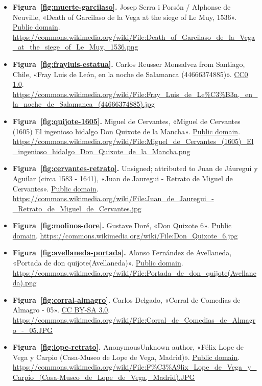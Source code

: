 \documentclass{book}
\begin{document}
\begin{itemize}
\item \textbf{Figura~\ref{fig:muerte-garcilaso}.} Josep Serra i Porsón / Alphonse de Neuville, «Death of Garcilaso de la Vega at the siege of Le Muy, 1536». \href{https://creativecommons.org/publicdomain/mark/1.0/}{Public domain}. \url{https://commons.wikimedia.org/wiki/File:Death_of_Garcilaso_de_la_Vega_at_the_siege_of_Le_Muy,_1536.png}
\item \textbf{Figura~\ref{fig:frayluis-estatua}.} Carlos Reusser Monsalvez from Santiago, Chile, «Fray Luis de León, en la noche de Salamanca (44666374885)». \href{https://creativecommons.org/publicdomain/zero/1.0/}{CC0 1.0}. \url{https://commons.wikimedia.org/wiki/File:Fray_Luis_de_Le%C3%B3n,_en_la_noche_de_Salamanca_(44666374885).jpg}
\item \textbf{Figura~\ref{fig:quijote-1605}.} Miguel de Cervantes, «Miguel de Cervantes (1605) El ingenioso hidalgo Don Quixote de la Mancha». \href{https://creativecommons.org/publicdomain/mark/1.0/}{Public domain}. \url{https://commons.wikimedia.org/wiki/File:Miguel_de_Cervantes_(1605)_El_ingenioso_hidalgo_Don_Quixote_de_la_Mancha.png}
\item \textbf{Figura~\ref{fig:cervantes-retrato}.} Unsigned; attributed to Juan de Jáuregui y Aguilar (circa 1583 - 1641), «Juan de Jauregui - Retrato de Miguel de Cervantes». \href{https://creativecommons.org/publicdomain/mark/1.0/}{Public domain}. \url{https://commons.wikimedia.org/wiki/File:Juan_de_Jauregui_-_Retrato_de_Miguel_de_Cervantes.jpg}
\item \textbf{Figura~\ref{fig:molinos-dore}.} Gustave Doré, «Don Quixote 6». \href{https://creativecommons.org/publicdomain/mark/1.0/}{Public domain}. \url{https://commons.wikimedia.org/wiki/File:Don_Quixote_6.jpg}
\item \textbf{Figura~\ref{fig:avellaneda-portada}.} Alonso Fernández de Avellaneda, «Portada de don quijote(Avellaneda)». \href{https://creativecommons.org/publicdomain/mark/1.0/}{Public domain}. \url{https://commons.wikimedia.org/wiki/File:Portada_de_don_quijote(Avellaneda).png}
\item \textbf{Figura~\ref{fig:corral-almagro}.} Carlos Delgado, «Corral de Comedias de Almagro - 05». \href{https://creativecommons.org/licenses/by-sa/3.0/}{CC BY-SA 3.0}. \url{https://commons.wikimedia.org/wiki/File:Corral_de_Comedias_de_Almagro_-_05.JPG}
\item \textbf{Figura~\ref{fig:lope-retrato}.} AnonymousUnknown author, «Félix Lope de Vega y Carpio (Casa-Museo de Lope de Vega, Madrid)». \href{https://creativecommons.org/publicdomain/mark/1.0/}{Public domain}. \url{https://commons.wikimedia.org/wiki/File:F%C3%A9lix_Lope_de_Vega_y_Carpio_(Casa-Museo_de_Lope_de_Vega,_Madrid).JPG}

\end{itemize}
\end{document}
